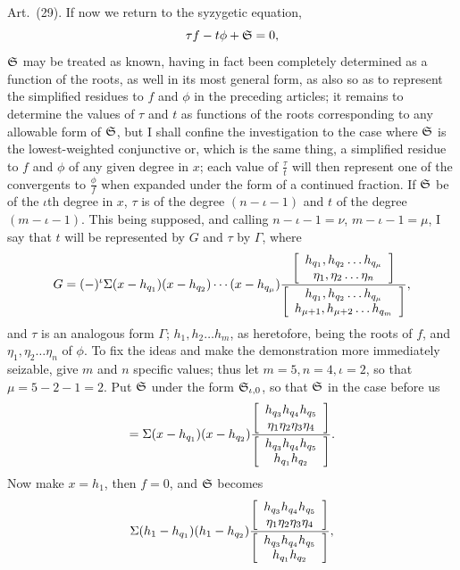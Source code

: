 \documentclass[11pt]{article}
\newcommand{\art}[1]{\par\smallskip\noindent Art.~(#1).\quad}
\begin{document}
\art{29} If now we return to the syzygetic equation,
\[
\tau f-t\phi+\mathfrak{S}=0,
\]
$\mathfrak{S}$ may be treated as known, having in fact been completely determined as a function of the roots, as well in its most general form, as also so as to represent the simplified residues to $f$ and $\phi$ in the preceding articles; it remains to determine the values of $\tau$ and $t$ as functions of the roots corresponding to any allowable form of $\mathfrak{S}$, but I shall confine the investigation to the case where $\mathfrak{S}$ is the lowest-weighted conjunctive or, which is the same thing, a simplified residue to $f$ and $\phi$ of any given degree in $x$; each value of $\frac{\tau}{t}$ will then represent one of the convergents to $\frac{\phi}{f}$ when expanded under the form of a continued fraction. If $\mathfrak{S}$ be of the $\iota$th degree in $x$, $\tau$ is of the degree $(n-\iota-1)$ and $t$ of the degree $(m-\iota-1)$. This being supposed, and calling $n-\iota-1=\nu$, $m-\iota-1=\mu$, I say that $t$ will be represented by $G$ and $\tau$ by $\Gamma$, where
\[
G=(-)^\iota\Sigma(x-h_{q_1})(x-h_{q_2})\cdots(x-h_{q_\mu})
\frac{\left[\begin{array}{c}h_{q_1},h_{q_2}\ldots h_{q_\mu}\\\eta_1,\eta_2\ldots\eta_n\end{array}\right]}
{\left[\begin{array}{c}h_{q_1},h_{q_2}\ldots h_{q_\mu}\\h_{\mu+1},h_{\mu+2}\ldots h_{q_m}\end{array}\right]},
\]
and $\tau$ is an analogous form $\Gamma$; $h_1,h_2\ldots h_m$, as heretofore, being the roots of $f$, and $\eta_1,\eta_2\ldots\eta_n$ of $\phi$. To fix the ideas and make the demonstration more immediately seizable, give $m$ and $n$ specific values; thus let $m=5,n=4,\iota=2$, so that $\mu=5-2-1=2$. Put $\mathfrak{S}$ under the form $\mathfrak{S}_{\iota,0}$, so that $\mathfrak{S}$ in the case before us
\[
=\Sigma(x-h_{q_1})(x-h_{q_2})
\frac{\left[\begin{array}{c}h_{q_3}h_{q_4}h_{q_5}\\\eta_1\eta_2\eta_3\eta_4\end{array}\right]}
{\left[\begin{array}{c}h_{q_3}h_{q_4}h_{q_5}\\h_{q_1}h_{q_2}\end{array}\right]}.
\]
Now make $x=h_1$, then $f=0$, and $\mathfrak{S}$ becomes
\[
\Sigma(h_1-h_{q_1})(h_1-h_{q_2})
\frac{\left[\begin{array}{c}h_{q_3}h_{q_4}h_{q_5}\\\eta_1\eta_2\eta_3\eta_4\end{array}\right]}
{\left[\begin{array}{c}h_{q_3}h_{q_4}h_{q_5}\\h_{q_1}h_{q_2}\end{array}\right]},
\]
\end{document}

